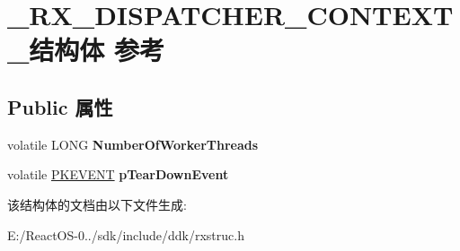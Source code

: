 \hypertarget{struct___r_x___d_i_s_p_a_t_c_h_e_r___c_o_n_t_e_x_t__}{}\section{\+\_\+\+R\+X\+\_\+\+D\+I\+S\+P\+A\+T\+C\+H\+E\+R\+\_\+\+C\+O\+N\+T\+E\+X\+T\+\_\+结构体 参考}
\label{struct___r_x___d_i_s_p_a_t_c_h_e_r___c_o_n_t_e_x_t__}
\subsection*{Public 属性}
\begin{DoxyCompactItemize}
\item 
\mbox{\label{struct___r_x___d_i_s_p_a_t_c_h_e_r___c_o_n_t_e_x_t___abfb60f4b8ed77b499af775940673b27f}} 
volatile L\+O\+NG {\bfseries Number\+Of\+Worker\+Threads}
\item 
\mbox{\label{struct___r_x___d_i_s_p_a_t_c_h_e_r___c_o_n_t_e_x_t___a983e2a6a48a439f2a28132944365f58c}} 
volatile \hyperlink{struct___k_e_v_e_n_t}{P\+K\+E\+V\+E\+NT} {\bfseries p\+Tear\+Down\+Event}
\end{DoxyCompactItemize}


该结构体的文档由以下文件生成\+:\begin{DoxyCompactItemize}
\item 
E\+:/\+React\+O\+S-\/0../sdk/include/ddk/rxstruc.\+h\end{DoxyCompactItemize}
